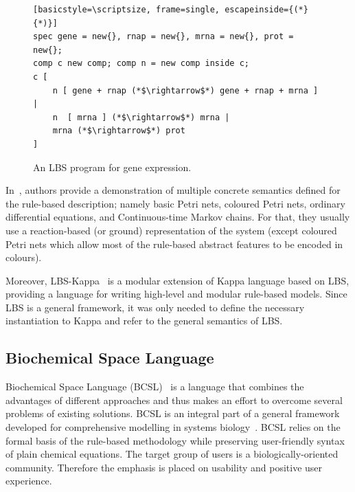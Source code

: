 \documentclass[11pt,a4paper]{report}
\begin{document}
\begin{figure}[!h]
\lstset{language=LBS}
\begin{lstlisting}[basicstyle=\scriptsize, frame=single, escapeinside={(*}{*)}]
spec gene = new{}, rnap = new{}, mrna = new{}, prot = new{}; 
comp c new comp; comp n = new comp inside c;
c [ 
	n [ gene + rnap (*$\rightarrow$*) gene + rnap + mrna ] | 
	n  [ mrna ] (*$\rightarrow$*) mrna | 
	mrna (*$\rightarrow$*) prot
]
\end{lstlisting}
\caption{An LBS program for gene expression.}\label{LBS_example}
\end{figure}

In~\cite{Pedersen}, authors provide a demonstration of multiple concrete semantics defined for the rule-based description; namely basic Petri nets, coloured Petri nets, ordinary differential equations, and Continuous-time Markov chains. For that, they usually use a reaction-based (or ground) representation of the system (except coloured Petri nets which allow most of the rule-based abstract features to be encoded in colours).

Moreover, LBS-Kappa~\cite{pedersen2015high} is a modular extension of Kappa language based on LBS, providing a language for writing high-level and modular rule-based models. Since LBS is a general framework, it was only needed to define the necessary instantiation to Kappa and refer to the general semantics of LBS. 

\subsection{Biochemical Space Language}

Biochemical Space Language (BCSL)~\cite{trojak2018sasb} is a language that combines the advantages of different approaches and thus makes an effort to overcome several problems of existing solutions. BCSL is an integral part of a general framework developed for comprehensive modelling in systems biology~\cite{BCS,klement2013comprehensive}. BCSL relies on the formal basis of the rule-based methodology while preserving user-friendly syntax of plain chemical equations. The target group of users is a biologically-oriented community. Therefore the emphasis is placed on usability and positive user experience.
\end{document}
